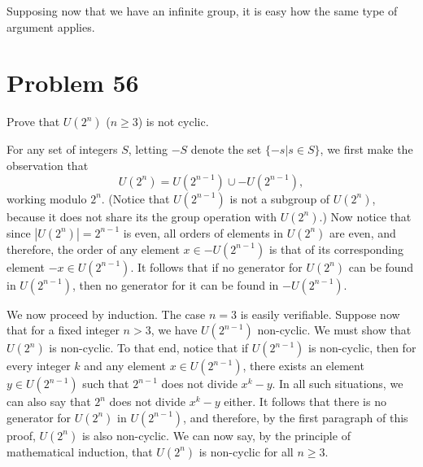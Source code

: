 \documentclass[12pt]{article}
\begin{document}
Supposing now that we have an infinite group, it is easy how the same type
of argument applies.

\section*{Problem 56}

Prove that $U(2^n)$ ($n\geq 3$) is not cyclic.

For any set of integers $S$, letting $-S$ denote the set $\{-s|s\in S\}$,
we first make the observation that
\begin{equation*}
U(2^n)=U(2^{n-1})\cup -U(2^{n-1}),
\end{equation*}
working modulo $2^n$.  (Notice that $U(2^{n-1})$ is not a subgroup of $U(2^n)$, because
it does not share its the group operation with $U(2^n)$.)  Now notice that since $|U(2^n)|=2^{n-1}$ is even,
all orders of elements in $U(2^n)$ are even, and therefore,
the order of any element $x\in -U(2^{n-1})$ is that of its corresponding
element $-x\in U(2^{n-1})$.  It follows that if no generator for $U(2^n)$
can be found in $U(2^{n-1})$, then no generator for it can be found in $-U(2^{n-1})$.

We now proceed by induction.  The case $n=3$ is easily verifiable.
Suppose now that for a fixed integer $n>3$, we have $U(2^{n-1})$ non-cyclic.
We must show that $U(2^n)$ is non-cyclic.  To that end, notice that if $U(2^{n-1})$
is non-cyclic, then for every integer $k$ and any element $x\in U(2^{n-1})$, there
exists an element $y\in U(2^{n-1})$ such that $2^{n-1}$ does not divide $x^k-y$.
In all such situations, we can also say that $2^n$ does not divide $x^k-y$ either.
It follows that there is no generator for $U(2^n)$ in $U(2^{n-1})$, and therefore,
by the first paragraph of this proof, $U(2^n)$ is also non-cyclic.
We can now say, by the principle of mathematical induction, that $U(2^n)$ is non-cyclic for all $n\geq 3$.
\end{document}
